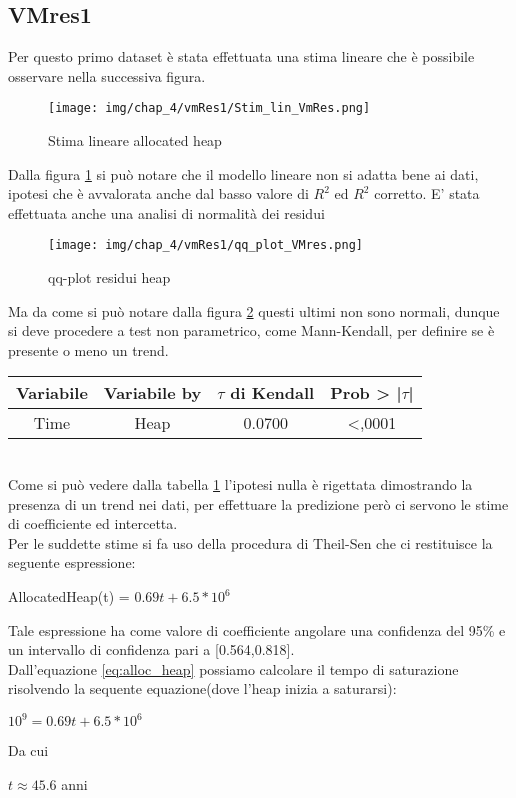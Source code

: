 \subsection{VMres1}
Per questo primo dataset è stata effettuata una stima lineare che è possibile osservare nella successiva figura.
\begin{figure}[H]
    \centering
    \texttt{[image: img/chap\_4/vmRes1/Stim\_lin\_VmRes.png]}
    \caption{Stima lineare allocated heap}
    \label{fig:stim_lin_VmRes1}
\end{figure}
\noindent
Dalla figura \ref{fig:stim_lin_VmRes1} si può notare che il modello lineare non si adatta bene ai dati, ipotesi che è avvalorata anche dal basso valore di $R^2$ ed $R^2$ corretto.
E' stata effettuata anche una analisi di normalità dei residui
\begin{figure}[H]
    \centering
    \texttt{[image: img/chap\_4/vmRes1/qq\_plot\_VMres.png]}
    \caption{qq-plot residui heap}
    \label{fig:qq_plot_VmRes1}
\end{figure}
Ma da come si può notare dalla figura \ref{fig:qq_plot_VmRes1} questi ultimi non sono normali, dunque si deve procedere a test non parametrico, come Mann-Kendall, per definire se è presente o meno un trend.\\
\begin{table}[htbp]
    \centering
    \label{tab:Mann-kendall}
    \begin{tabular}{|c|c|c|c|} %
        \hline
        Variabile & Variabile by & $\tau$ di Kendall &Prob > |$\tau$| \\ %
        \hline
        Time & Heap & 0.0700 & <,0001\\
        \hline
    \end{tabular}
\end{table}
\\
Come si può vedere dalla tabella \ref{tab:Mann-kendall} l'ipotesi nulla è rigettata dimostrando la presenza di un trend nei dati, per effettuare la predizione però ci servono le stime di coefficiente ed intercetta.\\
Per le suddette stime si fa uso della procedura di Theil-Sen che ci restituisce la seguente espressione:
\begin{center}
   AllocatedHeap(t) = $0.69t + 6.5*10^6$
   \label{eq:alloc_heap}
\end{center}
Tale espressione ha come valore di coefficiente angolare una confidenza del 95\% e un intervallo di confidenza pari a [0.564,0.818].\\
Dall'equazione \ref{eq:alloc_heap} possiamo calcolare il tempo di saturazione risolvendo la sequente equazione(dove l'heap inizia a saturarsi):
\begin{center}
    $
    10^9 = 0.69t+6.5*10^6
    $\\
\end{center}
Da cui 
\begin{center}
    $
    t \approx 45.6$ anni
\end{center}
\newpage
